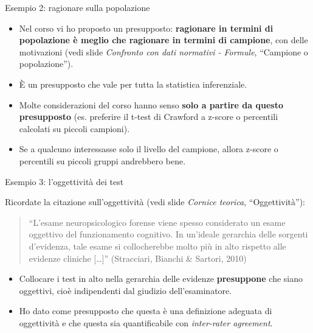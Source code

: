 \documentclass[
  ignorenonframetext,
  aspectratio=169,
]{beamer}
\providecommand{\tightlist}{%
  \setlength{\itemsep}{0pt}\setlength{\parskip}{0pt}}
\begin{document}
\begin{frame}{Esempio 2: ragionare sulla popolazione}
\label{esempio-2-ragionare-sulla-popolazione}
\small

\begin{itemize}
\tightlist
\item
  Nel corso vi ho proposto un presupposto: \textbf{ragionare in termini
  di popolazione è meglio che ragionare in termini di campione}, con
  delle motivazioni (vedi slide \emph{Confronto con dati normativi -
  Formule}, ``Campione o popolazione'').
\item
  È un presupposto che vale per tutta la statistica inferenziale. \pause
\item
  Molte considerazioni del corso hanno senso \textbf{solo a partire da
  questo presupposto} (es. preferire il t-test di Crawford a z-score o
  percentili calcolati su piccoli campioni).
\item
  Se a qualcuno interessasse solo il livello del campione, allora
  z-score o percentili su piccoli gruppi andrebbero bene.
\end{itemize}
\end{frame}

\begin{frame}{Esempio 3: l'oggettività dei test}
\label{esempio-3-loggettivituxe0-dei-test}
\small

Ricordate la citazione sull'oggettività (vedi slide \emph{Cornice
teorica}, ``Oggettività''):

\begin{quote}
\footnotesize ``L'esame neuropsicologico forense viene spesso
considerato un esame oggettivo del funzionamento cognitivo. In un'ideale
gerarchia delle sorgenti d'evidenza, tale esame si collocherebbe molto
più in alto rispetto alle evidenze cliniche {[}\ldots{]}'' (Stracciari,
Bianchi \& Sartori, 2010)
\end{quote}

\pause
\small

\begin{itemize}
\tightlist
\item
  Collocare i test in alto nella gerarchia delle evidenze
  \textbf{presuppone} che siano oggettivi, cioè indipendenti dal
  giudizio dell'esaminatore.
\item
  Ho dato come presupposto che questa è una definizione adeguata di
  oggettività e che questa sia quantificabile con \emph{inter-rater
  agreement}.
\end{itemize}
\end{frame}
\end{document}
